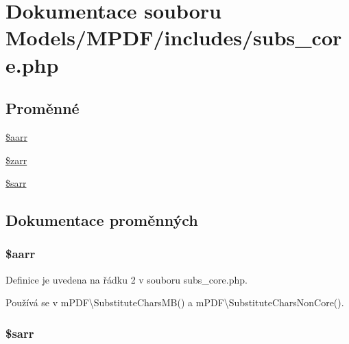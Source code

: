 \hypertarget{subs__core_8php}{\section{Dokumentace souboru Models/\-M\-P\-D\-F/includes/subs\-\_\-core.php}
\label{subs__core_8php}
}
\subsection*{Proměnné}
\begin{DoxyCompactItemize}
\item 
\hyperlink{subs__core_8php_a2e24a6ec0b42437a7293a51b84249b79}{\$aarr}
\item 
\hyperlink{subs__core_8php_a3001ad6d714caa939671f2954a40c018}{\$zarr}
\item 
\hyperlink{subs__core_8php_ad61b24c5e84b96c0fc7116f57ba04321}{\$sarr}
\end{DoxyCompactItemize}


\subsection{Dokumentace proměnných}
\hypertarget{subs__core_8php_a2e24a6ec0b42437a7293a51b84249b79}{
\subsubsection[{\$aarr}]{\setlength{\rightskip}{0pt plus 5cm}\$aarr}}\label{subs__core_8php_a2e24a6ec0b42437a7293a51b84249b79}


Definice je uvedena na řádku 2 v souboru subs\-\_\-core.\-php.



Používá se v m\-P\-D\-F\textbackslash{}\-Substitute\-Chars\-M\-B() a m\-P\-D\-F\textbackslash{}\-Substitute\-Chars\-Non\-Core().

\hypertarget{subs__core_8php_ad61b24c5e84b96c0fc7116f57ba04321}{
\subsubsection[{\$sarr}]{\setlength{\rightskip}{0pt plus 5cm}\$sarr}}\label{subs__core_8php_ad61b24c5e84b96c0fc7116f57ba04321}


